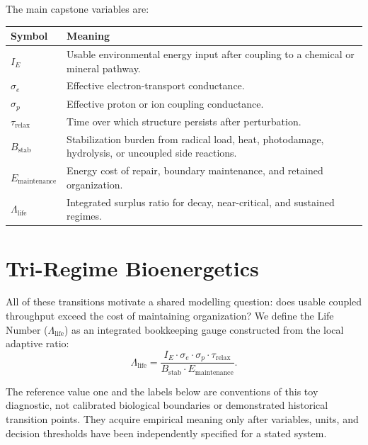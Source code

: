 \documentclass[11pt,a4paper]{article}
\begin{document}
The main capstone variables are:
\begin{center}
\small
\begin{tabular}{p{}p{}}
\toprule
Symbol & Meaning \\
\midrule
$I_E$ & Usable environmental energy input after coupling to a chemical or mineral pathway. \\
$\sigma_e$ & Effective electron-transport conductance. \\
$\sigma_p$ & Effective proton or ion coupling conductance. \\
$\tau_{\mathrm{relax}}$ & Time over which structure persists after perturbation. \\
$B_{\mathrm{stab}}$ & Stabilization burden from radical load, heat, photodamage, hydrolysis, or uncoupled side reactions. \\
$E_{\mathrm{maintenance}}$ & Energy cost of repair, boundary maintenance, and retained organization. \\
$\Lambda_{\mathrm{life}}$ & Integrated surplus ratio for decay, near-critical, and sustained regimes. \\
\bottomrule
\end{tabular}
\end{center}

\section{Tri-Regime Bioenergetics}
All of these transitions motivate a shared modelling question: does usable
coupled throughput exceed the cost of maintaining organization? We define the
Life Number ($\Lambda_{\mathrm{life}}$) as an integrated bookkeeping gauge
constructed from the local adaptive ratio:
\begin{equation}
 \Lambda_{\mathrm{life}} =
 \frac{I_E \cdot \sigma_e \cdot \sigma_p \cdot \tau_{\mathrm{relax}}}
 {B_{\mathrm{stab}} \cdot E_{\mathrm{maintenance}}}.
\end{equation}

The reference value one and the labels below are conventions of this toy
diagnostic, not calibrated biological boundaries or demonstrated historical
transition points. They acquire empirical meaning only after variables, units,
and decision thresholds have been independently specified for a stated system.
\end{document}
